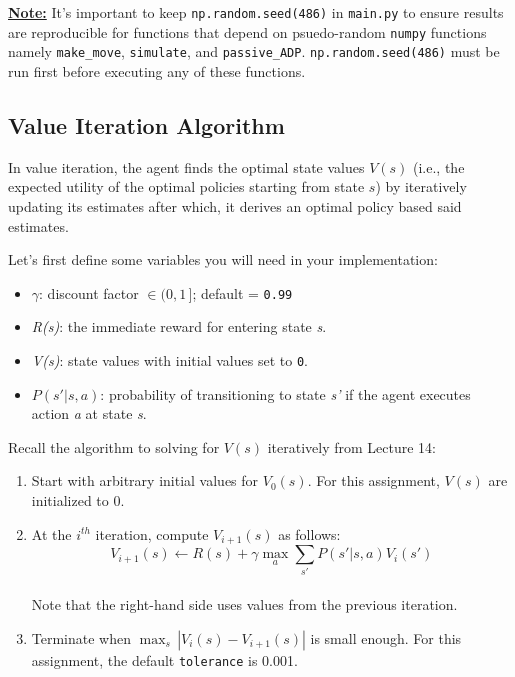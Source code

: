 \documentclass[12pt]{article}
\begin{document}

\underline{\textbf{Note:}}  It's important to keep \texttt{np.random.seed(486)} in \texttt{main.py} to ensure results are reproducible for functions that depend on psuedo-random \texttt{numpy} functions namely \texttt{make\_move}, \texttt{simulate}, and \texttt{passive\_ADP}. \texttt{np.random.seed(486)} must be run first before executing any of these functions.


\subsection{Value Iteration Algorithm} \label{sec:value_iter}
In value iteration, the agent finds the optimal state values $V(s)$ (i.e., the expected utility of the optimal policies starting from state $s$) by iteratively updating its estimates after which, it derives an optimal policy based said estimates.

Let's first define some variables you will need in your implementation:
\begin{itemize}
    \item \textbf{$\gamma$}: discount factor $\in \mathopen( 0, 1 \,\mathclose]$; default = \texttt{0.99}
    \item \textit{R(s)}: the immediate reward for entering state \textit{s}. 
    \item \textit{V(s)}: state values with initial values set to \texttt{0}.
    \item \textit{$P(s'| s,a)$}: probability of transitioning to state \textit{s'} if the agent executes action \textit{a} at state \textit{s}.
\end{itemize}

Recall the algorithm to solving for $V(s)$ iteratively from Lecture 14:
\begin{enumerate}

    \item Start with arbitrary initial values for $V_0(s)$. For this assignment, $V(s)$ are initialized to 0.
    \item At the $i^{th}$ iteration, compute $V_{i+1}(s)$ as follows:
    $$V_{i+1}(s) \leftarrow R(s) + \gamma \max_a \sum_{s'} P(s'|s, a) V_i(s')$$\\
    Note that the right-hand side uses values from the previous iteration.
    \item Terminate when $\max_s \, |V_i(s) - V_{i+1}(s)|$  is small enough. For this assignment, the default \texttt{tolerance} is 0.001.
\end{enumerate}
\end{document}
